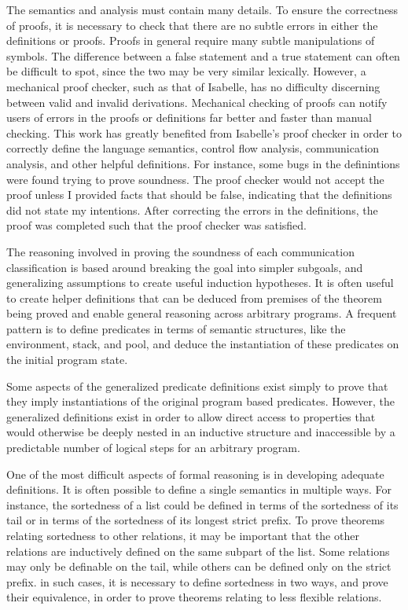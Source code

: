 \documentclass[10pt]{article}
\begin{document}
The semantics and analysis must contain many details. To ensure the
correctness of proofs, it is necessary to check that there are no subtle errors in either the 
definitions or proofs. Proofs in general require many subtle manipulations of symbols. The
difference between a false statement and a true statement can often be difficult to spot, since
the two may be very similar lexically. However, a mechanical proof checker, such as that of 
Isabelle, has no difficulty discerning between valid and invalid derivations.
Mechanical checking of proofs can notify users of errors in the proofs or definitions far better
and faster than manual checking. This work has greatly benefited from Isabelle's proof checker in
order to correctly define the language semantics, control flow analysis, communication analysis,
and other helpful definitions. For instance, some bugs in the
definintions were found trying to prove
soundness. The proof checker would not accept the proof unless I provided facts that
should be false, indicating that the definitions did not state my intentions.
After correcting the errors in the definitions, the proof was completed such that the proof
checker was satisfied.

The reasoning involved in proving the soundness of each communication classification
is based around breaking the goal into simpler subgoals, and generalizing assumptions to create
useful induction hypotheses.  It is often useful to
create helper definitions that can be deduced
from premises of the theorem being proved and enable
general reasoning across arbitrary programs.
A frequent pattern is to define
predicates in terms of semantic structures, like the environment, stack, and pool, and deduce 
the instantiation of these predicates on the initial program state. 

Some aspects of the generalized predicate definitions exist simply to prove that they imply
instantiations of the original program based predicates. However, the generalized
definitions exist in order to allow direct access to properties that would
otherwise be deeply nested
in an inductive structure and inaccessible by a predictable number of
logical steps for an arbitrary
program.

One of the most difficult aspects of formal reasoning is in developing adequate definitions.
It is often possible to define a single semantics in multiple ways.
For instance, the sortedness of a list could be defined in terms of the sortedness of its tail
or in terms of the sortedness of its longest strict prefix. To prove theorems relating
sortedness to other relations, it may be important that the other relations are inductively
defined on the same subpart of the list. Some relations may only be definable on the tail,
while others can be defined only on the strict prefix. in such cases, it is necessary to
define sortedness in two ways, and prove their equivalence, in order to prove theorems relating
to less flexible relations.
\end{document}

